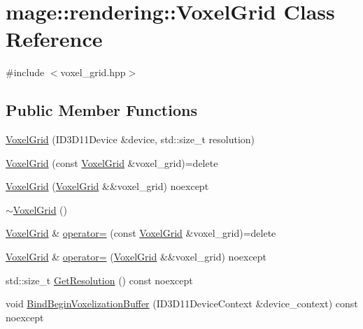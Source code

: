 \hypertarget{classmage_1_1rendering_1_1_voxel_grid}{}\section{mage\+:\+:rendering\+:\+:Voxel\+Grid Class Reference}
\label{classmage_1_1rendering_1_1_voxel_grid}


{\ttfamily \#include $<$voxel\+\_\+grid.\+hpp$>$}

\subsection*{Public Member Functions}
\begin{DoxyCompactItemize}
\item 
\mbox{\hyperlink{classmage_1_1rendering_1_1_voxel_grid_aee58286cd8f0cd3df8ee6ba3fb3fc7eb}{Voxel\+Grid}} (I\+D3\+D11\+Device \&device, std\+::size\+\_\+t resolution)
\item 
\mbox{\hyperlink{classmage_1_1rendering_1_1_voxel_grid_ace9aac1356e41996630c6247ece48417}{Voxel\+Grid}} (const \mbox{\hyperlink{classmage_1_1rendering_1_1_voxel_grid}{Voxel\+Grid}} \&voxel\+\_\+grid)=delete
\item 
\mbox{\hyperlink{classmage_1_1rendering_1_1_voxel_grid_a985cc9f8fbe4e49adf2b61de2b348125}{Voxel\+Grid}} (\mbox{\hyperlink{classmage_1_1rendering_1_1_voxel_grid}{Voxel\+Grid}} \&\&voxel\+\_\+grid) noexcept
\item 
\mbox{\hyperlink{classmage_1_1rendering_1_1_voxel_grid_aa349c9ddd6d6be9f12d7e399a0931f89}{$\sim$\+Voxel\+Grid}} ()
\item 
\mbox{\hyperlink{classmage_1_1rendering_1_1_voxel_grid}{Voxel\+Grid}} \& \mbox{\hyperlink{classmage_1_1rendering_1_1_voxel_grid_a90b94d3a00e365e1a03d1077a5c79a11}{operator=}} (const \mbox{\hyperlink{classmage_1_1rendering_1_1_voxel_grid}{Voxel\+Grid}} \&voxel\+\_\+grid)=delete
\item 
\mbox{\hyperlink{classmage_1_1rendering_1_1_voxel_grid}{Voxel\+Grid}} \& \mbox{\hyperlink{classmage_1_1rendering_1_1_voxel_grid_a9e0ae3de8c583879a3db8b6d787138ac}{operator=}} (\mbox{\hyperlink{classmage_1_1rendering_1_1_voxel_grid}{Voxel\+Grid}} \&\&voxel\+\_\+grid) noexcept
\item 
std\+::size\+\_\+t \mbox{\hyperlink{classmage_1_1rendering_1_1_voxel_grid_a87ac3c0efa804576bbb9e0c9ad244cfc}{Get\+Resolution}} () const noexcept
\item 
void \mbox{\hyperlink{classmage_1_1rendering_1_1_voxel_grid_a52254c5709b77d6c348eb15b782b5bc4}{Bind\+Begin\+Voxelization\+Buffer}} (I\+D3\+D11\+Device\+Context \&device\+\_\+context) const noexcept

\end{DoxyCompactItemize}
